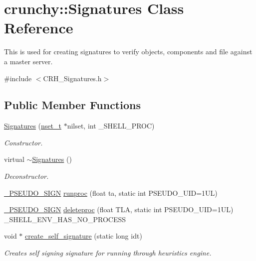 \hypertarget{classcrunchy_1_1_signatures}{}\section{crunchy\+:\+:Signatures Class Reference}
\label{classcrunchy_1_1_signatures}


This is used for creating signatures to verify objects, components and file against a master server.  




{\ttfamily \#include $<$C\+R\+H\+\_\+\+Signatures.\+h$>$}

\subsection*{Public Member Functions}
\begin{DoxyCompactItemize}
\item 
\hyperlink{classcrunchy_1_1_signatures_a953e432067bbec5ee40c6eecbcb106de}{Signatures} (\hyperlink{structcrunchy_1_1nset__t}{nset\+\_\+t} $\ast$nilset, int \+\_\+\+S\+H\+E\+L\+L\+\_\+\+P\+R\+OC)
\begin{DoxyCompactList}\small\item\em Constructor. \end{DoxyCompactList}\item 
virtual \hyperlink{classcrunchy_1_1_signatures_a1c96f7c33f3ed8cb6339eb406d9d3ca6}{$\sim$\+Signatures} ()
\begin{DoxyCompactList}\small\item\em Deconstructor. \end{DoxyCompactList}\item 
\hyperlink{_c_r_h___signatures_8h_a3f5aecd604689fdd466ced4997e5331e}{\+\_\+\+P\+S\+E\+U\+D\+O\+\_\+\+S\+I\+GN} \hyperlink{classcrunchy_1_1_signatures_af0273a4bbc0df1f36dbb43b396dc7dbf}{runproc} (float ta, static int P\+S\+E\+U\+D\+O\+\_\+\+U\+ID=1\+U\+L)
\item 
\hyperlink{_c_r_h___signatures_8h_a3f5aecd604689fdd466ced4997e5331e}{\+\_\+\+P\+S\+E\+U\+D\+O\+\_\+\+S\+I\+GN} \hyperlink{classcrunchy_1_1_signatures_a3eec9cfb4f8cf5fdbdf72769acf94a9c}{deleteproc} (float T\+LA, static int P\+S\+E\+U\+D\+O\+\_\+\+U\+ID=1\+U\+L) \+\_\+\+S\+H\+E\+L\+L\+\_\+\+E\+N\+V\+\_\+\+H\+A\+S\+\_\+\+N\+O\+\_\+\+P\+R\+O\+C\+E\+SS
\item 
void $\ast$ \hyperlink{classcrunchy_1_1_signatures_afefdc514b781bc498ae25612215c2678}{create\+\_\+self\+\_\+signature} (static long idt)
\begin{DoxyCompactList}\small\item\em Creates self signing signature for running through heuristics engine. \end{DoxyCompactList}\end{DoxyCompactItemize}


